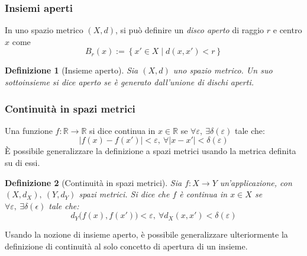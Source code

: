 \documentclass[11pt]{scrartcl}
\theoremstyle{style1}
\newtheorem{definizione}{Definizione}[section]
\numberwithin{equation}{subsection}
\begin{document}
\subsubsection{Insiemi aperti}
In uno spazio metrico $(X,d)$, si pu\`o definire un \textit{disco aperto} di raggio $r$ e centro $x$ come
\[
B_r(x) := \left\{ x' \in X  \mid d(x,x') < r \right\} 
\] 
\begin{definizione}
	[Insieme aperto]
	Sia $(X,d)$ uno spazio metrico. Un suo sottoinsieme si dice aperto se \`e generato dall'unione di dischi aperti.
\end{definizione}
\subsubsection{Continuit\`a in spazi metrici}
Una funzione $f:\mathbb{R}\to \mathbb{R}$ si dice continua in $x \in \mathbb{R}$ se $\forall \varepsilon , \ \exists \delta (\varepsilon )$ tale che:
\[
\lvert f(x) - f(x') \rvert < \varepsilon, \ \forall \lvert x-x' \rvert < \delta (\varepsilon )
\] 
\`E possibile generalizzare la definizione a spazi metrici usando la metrica definita su di essi.
\begin{definizione}
	[Continuit\`a in spazi metrici]
Sia $f : X\to Y$ un'applicazione, con $(X,d_X) , \ (Y,d_Y)$ spazi metrici. Si dice che $f$ \`e continua in $x \in X$ se $\forall \varepsilon , \ \exists \delta (\epsilon )$ tale che:
\begin{equation}
	d_Y \big(f(x), f(x')\big) < \varepsilon , \ \forall d_X(x,x')< \delta (\varepsilon )
\end{equation}
\end{definizione}
\noindent Usando la nozione di insieme aperto, \`e possibile generalizzare ulteriormente la definizione di continuit\`a al solo concetto di apertura di un insieme.
\end{document}
